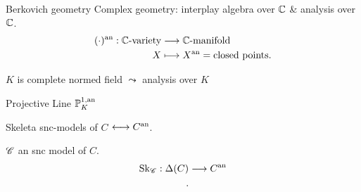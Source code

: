 \begin{frame}
	\tableofcontents[ 
currentsubsection, 
hideothersubsections, 
sectionstyle=show/hide, 
subsectionstyle=show/shaded, 
] 
\end{frame}


\begin{frame}{Berkovich geometry}
	Complex geometry: interplay algebra over $\mathbb C$ \& analysis over $\mathbb C$. 
	\begin{align*}
		(\cdot ){}^{\text{an}} : \mathbb C\text{-variety} &\longrightarrow \mathbb C\text{-manifold} \\
		X &\longmapsto X{}^{\text{an}} = \text{closed points} 
	.\end{align*}
	\pause

	$K$ is complete normed field $\leadsto$ analysis over $K$ 
\end{frame}

\begin{frame}{Projective Line $\mathbb P^{1, \text{an}}_{K}$}
\end{frame}

\begin{frame}{Skeleta}
	snc-models of $C$ $\longleftrightarrow C{}^{\text{an}}$.

	 $\mathscr C$ an snc model of  $C$. 
	 \begin{align*}
		 \operatorname{Sk}_{\mathscr C}: \Delta(C) &\longrightarrow C{}^{\text{an}} \\
	 .\end{align*}
\end{frame}
